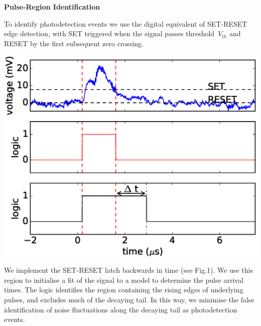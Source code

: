 
\begin{center}
  \begin{center} {\bf \Large \textsf {Pulse-Region Identification}}\end{center}
\end{center}

To identify
photodetection events
we use
the digital equivalent of SET-RESET edge detection,
with SET triggered when the signal passes threshold~$V_{th}$
and RESET by the first subsequent zero crossing.
\begin{figurehere}
  \begin{center}
    \includegraphics[width=1\linewidth]{figures/comparator/comparator_at_500ns.eps}
  \end{center}
  \vspace{-0.8cm}
\end{figurehere}
\vspace{1cm}
We implement the SET-RESET latch backwards in time (see Fig.1).
We use this region to initialise a fit of the signal to a model to determine the pulse arrival times. 
The logic identifies the region containing the rising edges of underlying pulses,
and excludes much of the decaying tail.
In this way, we minimise the false identification of noise fluctuations along the decaying tail as photodetection events.

